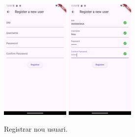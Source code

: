 \documentclass[a4paper,12pt,twoside]{ThesisStyle}
\begin{document}
\begin{figure}[h]
    \centering
    \includegraphics[width=0.3\textwidth]{imatges/registerUser.png}
    \includegraphics[width=0.3\textwidth]{imatges/registerUserWithvalues.png}
    \caption{Registrar nou usuari.}
    \label{fig: registrar nou usuari}
\end{figure}
\end{document}
